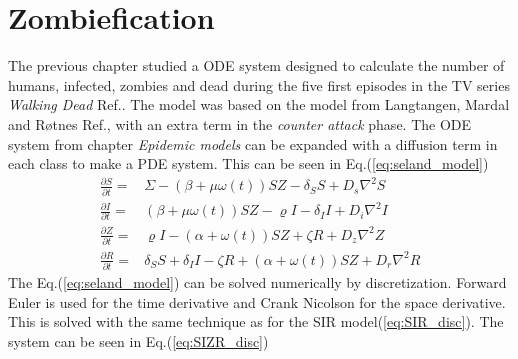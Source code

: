 \documentclass[%
twoside,                 %
final,                   %
10pt]{article}
\begin{document}
\section{Zombiefication}
The previous chapter studied a ODE system designed to calculate the number of humans, infected, zombies and dead during the five first episodes in the TV series \emph{Walking Dead} Ref.\cite{walking_dead}. The model was based on the model from Langtangen, Mardal and Røtnes Ref.\cite{zombie-math}, with an extra term in the \emph{counter attack} phase. The ODE system from chapter \emph{Epidemic models} can be expanded with a diffusion term in each class to make a PDE system. This can be seen in Eq.(\ref{eq:seland_model})  
\begin{equation} \label{eq:seland_model}
	\begin{aligned} 
	\frac{\partial S}{\partial t} =& \Sigma -(\beta+\mu \omega(t))SZ - \delta_SS +D_s\nabla^2 S \\
	\frac{\partial I}{\partial t} =& (\beta+\mu \omega(t))SZ - \varrho I - \delta_II+D_i\nabla^2 I\\
	\frac{\partial Z}{\partial t} =& \varrho I- (\alpha+\omega(t))SZ + \zeta R+D_z\nabla^2 Z\\
	\frac{\partial R}{\partial t} =& \delta_SS +\delta_II -\zeta R + (\alpha+\omega(t))SZ+D_r\nabla^2 R 
	\end{aligned}
\end{equation}
The Eq.(\ref{eq:seland_model}) can be solved numerically by discretization. Forward Euler is used for the time derivative and Crank Nicolson for the space derivative. This is solved with the same technique as for the SIR model(\ref{eq:SIR_disc}). The system can be seen in Eq.(\ref{eq:SIZR_disc})
\end{document}
